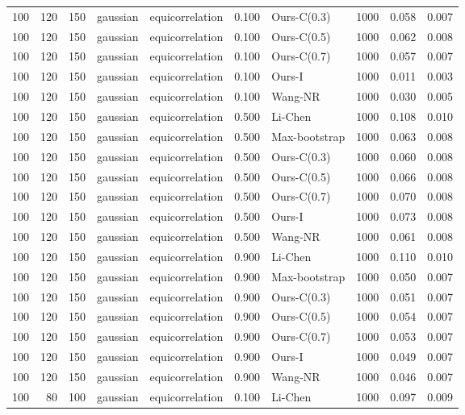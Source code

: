 \begin{tabular}{rrrllrlrrr}
100 & 120 & 150 & gaussian & equicorrelation & 0.100 & Ours-C(0.3) & 1000 & 0.058 & 0.007 \\
100 & 120 & 150 & gaussian & equicorrelation & 0.100 & Ours-C(0.5) & 1000 & 0.062 & 0.008 \\
100 & 120 & 150 & gaussian & equicorrelation & 0.100 & Ours-C(0.7) & 1000 & 0.057 & 0.007 \\
100 & 120 & 150 & gaussian & equicorrelation & 0.100 & Ours-I & 1000 & 0.011 & 0.003 \\
100 & 120 & 150 & gaussian & equicorrelation & 0.100 & Wang-NR & 1000 & 0.030 & 0.005 \\
100 & 120 & 150 & gaussian & equicorrelation & 0.500 & Li-Chen & 1000 & 0.108 & 0.010 \\
100 & 120 & 150 & gaussian & equicorrelation & 0.500 & Max-bootstrap & 1000 & 0.063 & 0.008 \\
100 & 120 & 150 & gaussian & equicorrelation & 0.500 & Ours-C(0.3) & 1000 & 0.060 & 0.008 \\
100 & 120 & 150 & gaussian & equicorrelation & 0.500 & Ours-C(0.5) & 1000 & 0.066 & 0.008 \\
100 & 120 & 150 & gaussian & equicorrelation & 0.500 & Ours-C(0.7) & 1000 & 0.070 & 0.008 \\
100 & 120 & 150 & gaussian & equicorrelation & 0.500 & Ours-I & 1000 & 0.073 & 0.008 \\
100 & 120 & 150 & gaussian & equicorrelation & 0.500 & Wang-NR & 1000 & 0.061 & 0.008 \\
100 & 120 & 150 & gaussian & equicorrelation & 0.900 & Li-Chen & 1000 & 0.110 & 0.010 \\
100 & 120 & 150 & gaussian & equicorrelation & 0.900 & Max-bootstrap & 1000 & 0.050 & 0.007 \\
100 & 120 & 150 & gaussian & equicorrelation & 0.900 & Ours-C(0.3) & 1000 & 0.051 & 0.007 \\
100 & 120 & 150 & gaussian & equicorrelation & 0.900 & Ours-C(0.5) & 1000 & 0.054 & 0.007 \\
100 & 120 & 150 & gaussian & equicorrelation & 0.900 & Ours-C(0.7) & 1000 & 0.053 & 0.007 \\
100 & 120 & 150 & gaussian & equicorrelation & 0.900 & Ours-I & 1000 & 0.049 & 0.007 \\
100 & 120 & 150 & gaussian & equicorrelation & 0.900 & Wang-NR & 1000 & 0.046 & 0.007 \\
100 & 80 & 100 & gaussian & equicorrelation & 0.100 & Li-Chen & 1000 & 0.097 & 0.009 \\

\end{tabular}
